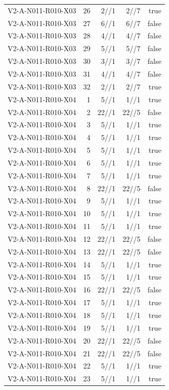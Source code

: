 {\begin{longtable}{lrrrr}
V2-A-N011-R010-X03 & 26 & 2//1 & 2//7 & true \\
V2-A-N011-R010-X03 & 27 & 6//1 & 6//7 & false \\
V2-A-N011-R010-X03 & 28 & 4//1 & 4//7 & false \\
V2-A-N011-R010-X03 & 29 & 5//1 & 5//7 & false \\
V2-A-N011-R010-X03 & 30 & 3//1 & 3//7 & false \\
V2-A-N011-R010-X03 & 31 & 4//1 & 4//7 & false \\
V2-A-N011-R010-X03 & 32 & 2//1 & 2//7 & true \\
V2-A-N011-R010-X04 & 1 & 5//1 & 1//1 & true \\
V2-A-N011-R010-X04 & 2 & 22//1 & 22//5 & false \\
V2-A-N011-R010-X04 & 3 & 5//1 & 1//1 & true \\
V2-A-N011-R010-X04 & 4 & 5//1 & 1//1 & true \\
V2-A-N011-R010-X04 & 5 & 5//1 & 1//1 & true \\
V2-A-N011-R010-X04 & 6 & 5//1 & 1//1 & true \\
V2-A-N011-R010-X04 & 7 & 5//1 & 1//1 & true \\
V2-A-N011-R010-X04 & 8 & 22//1 & 22//5 & false \\
V2-A-N011-R010-X04 & 9 & 5//1 & 1//1 & true \\
V2-A-N011-R010-X04 & 10 & 5//1 & 1//1 & true \\
V2-A-N011-R010-X04 & 11 & 5//1 & 1//1 & true \\
V2-A-N011-R010-X04 & 12 & 22//1 & 22//5 & false \\
V2-A-N011-R010-X04 & 13 & 22//1 & 22//5 & false \\
V2-A-N011-R010-X04 & 14 & 5//1 & 1//1 & true \\
V2-A-N011-R010-X04 & 15 & 5//1 & 1//1 & true \\
V2-A-N011-R010-X04 & 16 & 22//1 & 22//5 & false \\
V2-A-N011-R010-X04 & 17 & 5//1 & 1//1 & true \\
V2-A-N011-R010-X04 & 18 & 5//1 & 1//1 & true \\
V2-A-N011-R010-X04 & 19 & 5//1 & 1//1 & true \\
V2-A-N011-R010-X04 & 20 & 22//1 & 22//5 & false \\
V2-A-N011-R010-X04 & 21 & 22//1 & 22//5 & false \\
V2-A-N011-R010-X04 & 22 & 5//1 & 1//1 & true \\
V2-A-N011-R010-X04 & 23 & 5//1 & 1//1 & true \\

\end{longtable}}
